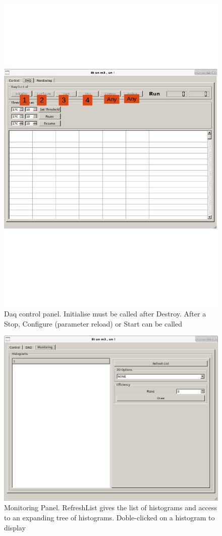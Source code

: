 \documentclass[english]{article}
\begin{document}
\begin{figure}[htp]
\centering
\includegraphics[width=1.\textwidth]{./SDaqImpl2.png}
\caption{Daq control panel. Initialise must be called after Destroy. After a Stop, Configure (parameter reload) or Start can be called}
\label{SDaqImpl2}
\end{figure}
\begin{figure}[htp]
\centering
\includegraphics[width=1.\textwidth]{./SDaqImpl3.png}
\caption{Monitoring Panel. RefreshList gives the list of histograms and access to an expanding tree of histograms. Doble-clicked on a histogram to display}
\label{SDaqImpl3}
\end{figure}
\end{document}
